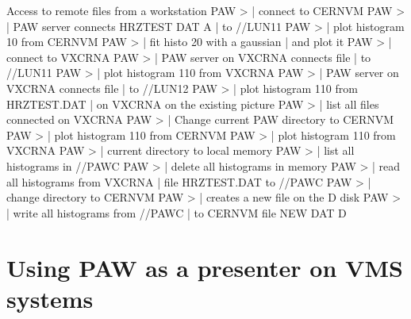 \begin{XMPt}{Access to remote files from a workstation}
PAW >                               | connect to CERNVM
PAW >                     | PAW server connects HRZTEST DAT A
                                                 | to //LUN11
PAW >                               | plot histogram 10 from CERNVM
PAW >                              | fit histo 20 with a gaussian
                                                 | and plot it
PAW >                               | connect to VXCRNA
PAW >        | PAW server on VXCRNA connects
file
                                                 | to //LUN11
PAW >                              | plot histogram 110 from VXCRNA
PAW >                     | PAW server on VXCRNA connects file
                                                 | to //LUN12
PAW >                            | plot histogram 110 from HRZTEST.DAT
                                                 | on VXCRNA on the existing picture
PAW >                                | list all files connected on VXCRNA
PAW >                               | Change current PAW directory to CERNVM
PAW >                              | plot histogram 110 from CERNVM
PAW >                     | plot histogram 110 from VXCRNA
PAW >                                 | current directory to local memory
PAW >                                  | list all histograms in //PAWC
PAW >                              | delete all histograms in memory
PAW >                             | read all histograms from VXCRNA
                                                 | file HRZTEST.DAT to //PAWC
PAW >                               | change directory to CERNVM
PAW >                | creates a new file on the D disk
PAW >                                     | write all histograms from //PAWC
                                                 | to CERNVM file NEW DAT D
\end{XMPt}
 
\section{Using PAW as a presenter on VMS systems}
 
